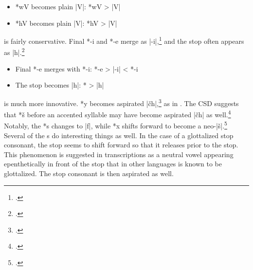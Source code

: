 \documentclass[output=paper]{LSP/langsci}
\begin{document}
\begin{itemize}
\item *wV becomes plain |V|: \hspace{1em} *wV	>	|V|
\item *hV becomes plain |V|: \hspace{1em} *hV	>	|V|
\end{itemize}


 is fairly conservative.  Final *-i and *-e merge as |-i|,\footnote{\citealt[901]{Rankinetal2006PDF}.}  and the  stop often appears as |h|.\footnote{\citealt[103]{Rankinetal2006PDF}.} 

\begin{itemize}
\item Final *-e merges with *-i: \hspace{2.1em} *-e	>	|-i|	<	*-i
\item The  stop becomes |h|: \hspace{1em} *\textsuperscript{}	>	|h|
\end{itemize}


 is much more innovative.   *y becomes aspirated |\v{c}h|,\footnote{\citealt[85, 242]{Rankinetal2006PDF}.} as in .  The CSD suggests that  *š before an accented syllable may have become aspirated |\v{c}h| as well.\footnote{\citealt[827]{Rankinetal2006PDF}.} Notably, the *s  changes to |f|, while  *x shifts forward to become a neo-|š|.\footnote{\citealt[174, 299]{Rankinetal2006PDF}.} Several of the  s do interesting things as well.  In the case of a glottalized stop consonant, the  stop seems to shift forward so that it releases prior to the stop.  This phenomenon is suggested in  transcriptions as a neutral vowel appearing epenthetically in front of the stop that in other languages is known to be glottalized.  The stop consonant is then aspirated as well.
\end{document}
